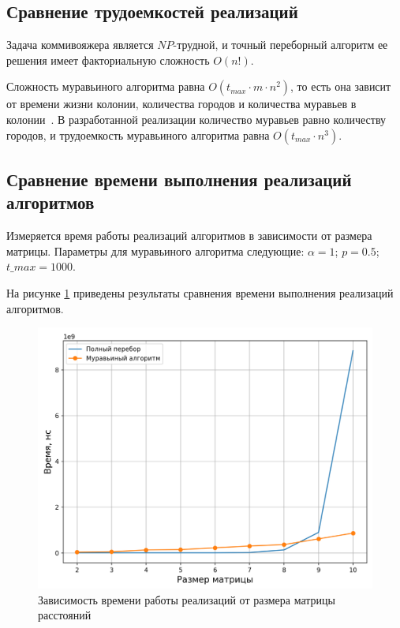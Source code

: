 \vspace{\baselineskip}
\subsection{Сравнение трудоемкостей реализаций}
\vspace{\baselineskip}

Задача коммивояжера является $NP$-трудной, и точный переборный алгоритм ее решения имеет факториальную сложность $O(n!)$. 

Сложность муравьиного алгоритма равна $O(t_{max} \cdot m \cdot n^2)$, то есть она зависит от времени жизни колонии, количества городов и количества муравьев в колонии~\cite{ulyanov}. 
В разработанной реализации количество муравьев равно количеству городов, и трудоемкость муравьиного алгоритма равна $O(t_{max} \cdot n^3)$.

\vspace{\baselineskip}
\subsection{Сравнение времени выполнения реализаций алгоритмов}
\vspace{\baselineskip}

Измеряется время работы реализаций алгоритмов в зависимости от размера матрицы. 
Параметры для муравьиного алгоритма следующие: $\alpha = 1$; $p = 0.5$; $t\_max = 1000$.

На рисунке \ref{fig:research} приведены результаты сравнения времени выполнения реализаций алгоритмов.
\clearpage

\begin{figure}[h!btp]
	\centering
	\includegraphics[width=400pt]{inc/time.png}
	\caption{Зависимость времени работы реализаций от размера матрицы расстояний}
	\label{fig:research}	
\end{figure}

